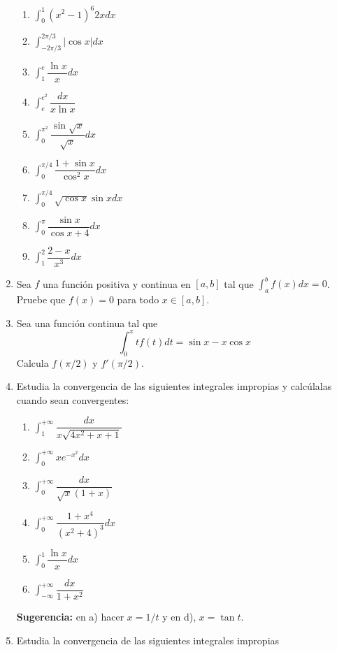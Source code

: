 \documentclass[10pt,twoside]{SelfArx} %
\begin{document}
\begin{enumerate}
	    \begin{enumerate}
	    	\item $ \displaystyle\int_{0}^{1}(x^{2}-1)^{6}2xdx $
	    	\item $ \displaystyle\int_{-2\pi/3}^{2\pi/3}|\cos x|dx $
	    	\item $ \displaystyle\int_{1}^{e}\dfrac{\ln x}{x}dx $
	    	\item $ \displaystyle\int_{e}^{e^{2}}\dfrac{dx}{x\ln x} $
	    	\item $ \displaystyle\int_{0}^{\pi^{2}}\dfrac{\sin \sqrt{x}}{\sqrt{x}}dx $
	    	\item $ \displaystyle\int_{0}^{\pi/4}\dfrac{1+\sin x}{\cos^{2} x}dx $
	    	\item $ \displaystyle\int_{0}^{\pi/4}\sqrt{\cos x}\sin xdx $
	    	\item $ \displaystyle\int_{0}^{\pi}\dfrac{\sin x}{\cos x+4}dx $
	    	\item $ \displaystyle\int_{1}^{2}\dfrac{2-x}{x^{3}}dx $
	    \end{enumerate}
	  \item  Sea $ f $ una función positiva y continua en $ [a,b] $ tal que $ \displaystyle\int_{a}^{b}f(x)dx=0 $. Pruebe que $ f(x)=0 $ para todo $ x\in [a,b] $.
	  \item Sea una función continua tal que 
	  \[ \int_{0}^{x}tf(t)dt=\sin x-x\cos x \]
	  Calcula $ f(\pi/2) $ y $ f'(\pi/2) $.
	  \item Estudia la convergencia de las siguientes integrales impropias y calcúlalas cuando sean convergentes:
	  \begin{enumerate}
	  	\item $ \displaystyle\int_{1}^{+\infty}\dfrac{dx}{x\sqrt{4x^{2}+x+1}} $
	  	\item $ \displaystyle\int_{0}^{+\infty}xe^{-x^{2}}dx $
	  	\item $ \displaystyle\int_{0}^{+\infty}\dfrac{dx}{\sqrt{x}(1+x)} $
	  	\item $ \displaystyle\int_{0}^{+\infty}\dfrac{1+x^{4}}{(x^{2}+4)^{3}}dx $
	  	\item $ \displaystyle\int_{0}^{1}\dfrac{\ln x}{x}dx $
	  	\item $ \displaystyle\int_{-\infty}^{+\infty}\dfrac{dx}{1+x^{2}} $
	  \end{enumerate}
	\textbf{  Sugerencia:} en a) hacer $ x=1/t $ y en d), $ x=\tan t $.
	\item Estudia la convergencia de las siguientes integrales impropias
	 \begin{enumerate}

\end{enumerate}
\end{enumerate}
\end{document}

